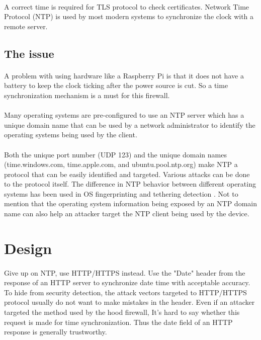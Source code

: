\documentclass[mscthesis]{usiinfthesis}
\begin{document}
\paragraph{}
A correct time is required for TLS protocol to check certificates. Network Time Protocol (NTP) is used by most modern systems to synchronize the clock with a remote server.
\subsection{The issue}
\paragraph{}
A problem with using hardware like a Raspberry Pi is that it does not have a battery to keep the clock ticking after the power source is cut. So a time synchronization mechanism is a must for this firewall.
\paragraph{}
Many operating systems are pre-configured to use an NTP server which has a unique domain name that can be used by a network administrator to identify the operating systems being used by the client.
\paragraph{}
Both the unique port number (UDP 123) and the unique domain names (time.windows.com, time.apple.com, and ubuntu.pool.ntp.org) make NTP a protocol that can be easily identified and targeted. Various attacks can be done to the protocol itself\citep{ntp:attack}. The difference in NTP behavior between different operating systems has been used in OS fingerprinting and tethering detection \citep{osandtether}. Not to mention that the operating system information being exposed by an NTP domain name can also help an attacker target the NTP client being used by the device.

\section{Design}
\paragraph{}
Give up on NTP, use HTTP/HTTPS instead. Use the "Date" header from the response of an HTTP server to synchronize date time with acceptable accuracy. To hide from security detection, the attack vectors targeted to HTTP/HTTPS protocol usually do not want to make mistakes in the header. Even if an attacker targeted the method used by the hood firewall, It's hard to say whether this request is made for time synchronization. Thus the date field of an HTTP response is generally trustworthy.
\end{document}
